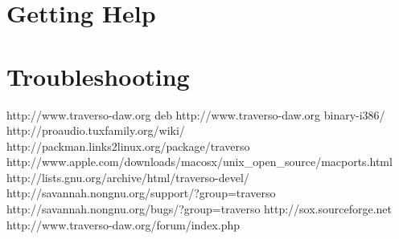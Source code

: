 \documentclass[a4paper,
               12pt,
               pdftex,
               twoside,
               smallheadings,
               headinclude,
               headsepline,
               DIV16,
               BCOR10mm
               ]{scrreprt}
\begin{document}
\chapter{Getting Help\label{sect_help}}

\chapter{Troubleshooting}


\begin{thebibliography}{xx}
   http://www.traverso-daw.org
   deb http://www.traverso-daw.org binary-i386/
   http://proaudio.tuxfamily.org/wiki/
   http://packman.links2linux.org/package/traverso
   http://www.apple.com/downloads/macosx/unix\_open\_source/macports.html
   http://lists.gnu.org/archive/html/traverso-devel/
   http://savannah.nongnu.org/support/?group=traverso
   http://savannah.nongnu.org/bugs/?group=traverso
   http://sox.sourceforge.net
   http://www.traverso-daw.org/forum/index.php
\end{thebibliography}
\end{document}
